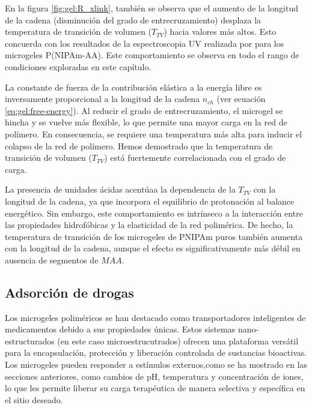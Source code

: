 En la figura \ref{fig:gel:R_xlink}, tambi\'en se observa que el aumento de la longitud de la cadena (disminuci\'on del grado de entrecruzamiento) desplaza la temperatura de transici\'on de volumen ($T_{TV}$) hacia valores m\'as altos. Esto concuerda con los resultados de la espectroscopia UV realizada por \citet{Lee2008} para los microgeles P(NIPAm-AA). Este comportamiento se observa en todo el rango de condiciones exploradas en este cap\'itulo.

La constante de fuerza de la contribuci\'on el\'astica a la energ\'ia libre es inversamente proporcional a la longitud de la cadena $n_{ch}$ (ver ecuaci\'on \ref{eq:gel:free-energy}). Al reducir el grado de entrecruzamiento, el microgel se hincha y se vuelve m\'as flexible, lo que permite una mayor carga en la red de pol\'imero. En consecuencia, se requiere una temperatura m\'as alta para inducir el colapso de la red de pol\'imero. Hemos demostrado que la temperatura de transici\'on de volumen ($T_{TV}$) est\'a fuertemente correlacionada con el grado de carga.

La presencia de unidades \'acidas acent\'uaa la dependencia de la $T_{TV}$ con la longitud de la cadena, ya que incorpora el equilibrio de protonaci\'on al balance energ\'etico. Sin embargo, este comportamiento es intr\'inseco a la interacci\'on entre las propiedades hidrof\'obicas y la elasticidad de la red polim\'erica. De hecho, la temperatura de transici\'on de los microgeles de PNIPAm puros tambi\'en aumenta con la longitud de la cadena, aunque el efecto es significativamente m\'as d\'ebil en ausencia de segmentos de $MAA$.



\subsection{Adsorci\'on de drogas}\label{sec:gel:ads-drogas}


Los microgeles polim\'ericos se han destacado como transportadores inteligentes de medicamentos debido a sus propiedades \'unicas. Estos sistemas nano-estructurados (en este caso microestrucutrados) ofrecen una plataforma vers\'atil para la encapsulaci\'on, protecci\'on y liberaci\'on controlada de sustancias bioactivas. Los microgeles pueden responder a est\'imulos externos,como se ha mostrado en las secciones anteriores,  como cambios de pH, temperatura y concentraci\'on de iones, lo que les permite liberar su carga terap\'eutica de manera selectiva y espec\'ifica en el sitio deseado. 

